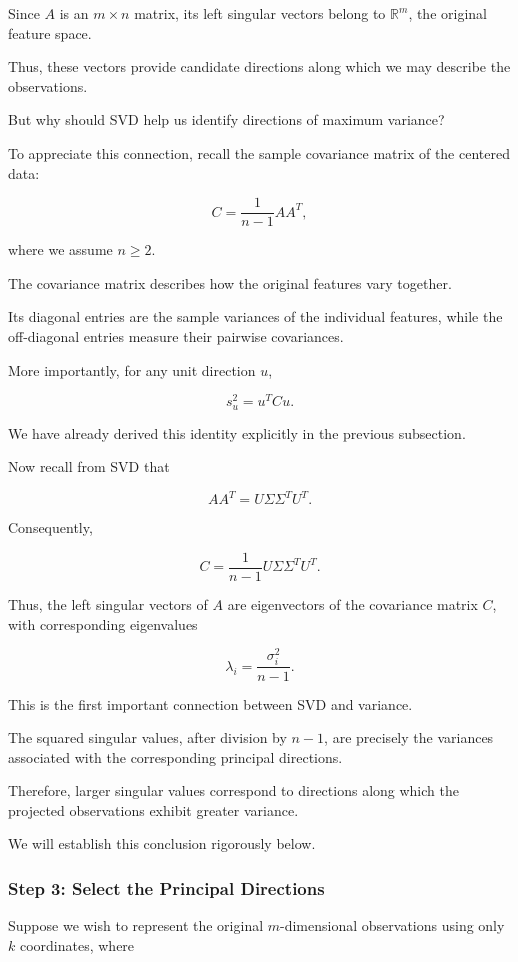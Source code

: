 \documentclass[11pt]{article}
\begin{document}
Since $A$ is an $m\times n$
matrix, its left singular
vectors belong to $\mathbb{R}^m$,
the original feature space.

Thus, these vectors provide
candidate directions along
which we may describe the
observations.

But why should SVD help us
identify directions of
maximum variance?

To appreciate this connection,
recall the sample covariance
matrix of the centered data:

\[
\boxed{
C=\frac{1}{n-1}AA^T,
}
\]

where we assume $n\geq 2$.

The covariance matrix describes
how the original features vary
together.

Its diagonal entries are
the sample variances of the
individual features, while
the off-diagonal entries
measure their pairwise
covariances.

More importantly, for any
unit direction $u$,

\[
\boxed{
s_u^2=u^TCu.
}
\]

We have already derived this identity
explicitly in the previous subsection.

Now recall from SVD that

\[
AA^T
=
U\Sigma\Sigma^TU^T.
\]

Consequently,

\[
C=
\frac{1}{n-1}
U\Sigma\Sigma^TU^T.
\]

Thus, the left singular vectors
of $A$ are eigenvectors of
the covariance matrix $C$,
with corresponding eigenvalues

\[
\boxed{
\lambda_i=
\frac{\sigma_i^2}{n-1}.
}
\]

This is the first important
connection between SVD and
variance.

The squared singular values,
after division by $n-1$,
are precisely the variances
associated with the corresponding
principal directions.

Therefore, larger singular
values correspond to directions
along which the projected
observations exhibit greater
variance.

We will establish this
conclusion rigorously below.

\subsubsection*{Step 3: Select the Principal
Directions}

Suppose we wish to represent
the original $m$-dimensional
observations using only
$k$ coordinates, where
\end{document}
